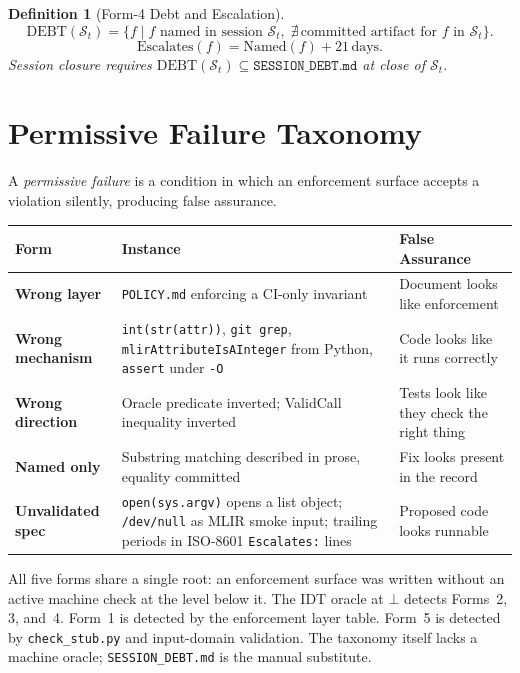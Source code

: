 \documentclass[11pt,letterpaper]{article}
\theoremstyle{pirtmthm}
\newtheorem{definition}{Definition}[section]
\theoremstyle{remark}
\begin{document}
\begin{definition}[Form-4 Debt and Escalation]
\[
  \mathrm{DEBT}(\mathcal{S}_t) =
  \{f \mid f \text{ named in session } \mathcal{S}_t,\;
    \nexists\,\text{committed artifact for } f \text{ in } \mathcal{S}_t\}.
\]
\[
  \mathrm{Escalates}(f) = \mathrm{Named}(f) + 21\,\text{days}.
\]
Session closure requires $\mathrm{DEBT}(\mathcal{S}_t)
\subseteq \texttt{SESSION\_DEBT.md}$ at close of $\mathcal{S}_t$.
\end{definition}

\section{Permissive Failure Taxonomy}

A \emph{permissive failure} is a condition in which an enforcement surface
accepts a violation silently, producing false assurance.

\begin{center}
\renewcommand{\arraystretch}{1.35}
\begin{tabular}{@{}>{\bfseries}p{2.6cm}p{4.8cm}p{4.6cm}@{}}
  \toprule
  Form & Instance & False Assurance \\
  \midrule
  Wrong layer
    & \texttt{POLICY.md} enforcing a CI-only invariant
    & Document looks like enforcement \\
  Wrong mechanism
    & \texttt{int(str(attr))}, \texttt{git grep},
      \texttt{mlirAttributeIsAInteger} from Python,
      \texttt{assert} under \texttt{-O}
    & Code looks like it runs correctly \\
  Wrong direction
    & Oracle predicate inverted; ValidCall inequality inverted
    & Tests look like they check the right thing \\
  Named only
    & Substring matching described in prose, equality committed
    & Fix looks present in the record \\
  Unvalidated spec
    & \texttt{open(sys.argv)} opens a list object;
      \texttt{/dev/null} as MLIR smoke input;
      trailing periods in ISO-8601 \texttt{Escalates:} lines
    & Proposed code looks runnable \\
  \bottomrule
\end{tabular}
\end{center}

\begin{thmbox}
All five forms share a single root: an enforcement surface was written without
an active machine check at the level below it.
The IDT oracle at $\bot$ detects Forms~2, 3, and~4.
Form~1 is detected by the enforcement layer table.
Form~5 is detected by \texttt{check\_stub.py} and input-domain validation.
The taxonomy itself lacks a machine oracle; \texttt{SESSION\_DEBT.md} is the
manual substitute.
\end{thmbox}
\end{document}
